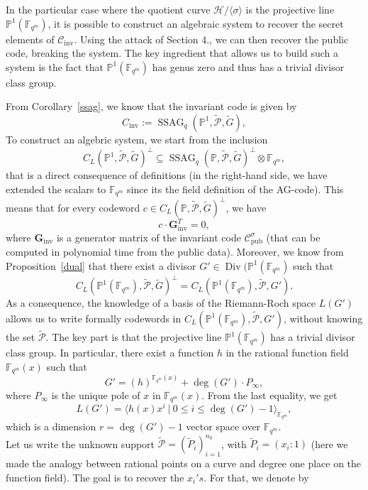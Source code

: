 \documentclass[10pt]{article}
\theoremstyle{definition}
\theoremstyle{definition}
\theoremstyle{definition}
\newcommand{\s}{\vspace{0.3cm}}
\newcommand{\cd}{\cdot}
\newcommand{\C}{\mathcal{C}}
\newcommand{\PP}{\mathbb{P}}
\newcommand{\fqm}{\mathbb{F}_{q^m}}
\newcommand{\su}{\subseteq}
\newcommand{\PR}{\mathcal{P}}
\newcommand{\Div}{\operatorname{Div}}
\newcommand{\ssag}{\operatorname{SSAG}}
\begin{document}
\s

In the particular case where the quotient curve $\mathcal{H}/\langle\sigma\rangle$ is the projective line $\PP^1(\fqm)$, it is possible to construct an algebraic system to recover the secret elements of $\C_{\mathrm{inv}}$. Using the attack of Section 4., we can then recover the public code, breaking the system. The key ingredient that allows us to build such a system is the fact that $\PP^1(\fqm)$ has genus zero and thus has a trivial divisor class group. 

\s

From Corollary~\ref{ssag}, we know that the invariant code is given by 
\[C_{\mathrm{inv}} := \ssag_q\left(\PP^1,\tilde{\PR},\tilde{G}\right),\]
To construct an algebric system, we start from the inclusion 
\[C_L(\PP^1,\tilde{\PR},\tilde{G})^{\perp} \su \ssag_q(\PP,\tilde{\PR},\tilde{G})^{\perp} \otimes \fqm,\]
that is a direct consequence of definitions (in the right-hand side, we have extended the scalars to $\fqm$ since its the field definition of the AG-code). This means that for every codeword $c \in C_L(\PP,\tilde{\PR},\tilde{G})^{\perp}$, we have 
\begin{equation}
c \cd \mathbf{G}_{\mathrm{inv}}^T = 0,
\end{equation}
where $\mathbf{G}_{\mathrm{inv}}$ is a generator matrix of the invariant code $\mathcal{C}_{\mathrm{pub}}^{\sigma}$ (that can be computed in polynomial time from the public data). Moreover, we know from Proposition~\ref{dual} that there exist a divisor $G' \in \Div(\PP^1(\fqm)$ such that
\[ C_L(\PP^1(\fqm),\tilde{\PR},\tilde{G})^{\perp} = C_L(\PP^1(\fqm),\tilde{\PR},G').\]
As a consequence, the knowledge of a basis of the Riemann-Roch space $L(G')$ allows us to write formally codewords in $C_L(\PP^1(\fqm),\tilde{\PR},G')$, without knowing the set $\tilde{\PR}$. The key part is that the projective line $\PP^1(\fqm)$ has a trivial divisor class group. In particular, there exist a function $h$ in the rational function field $\fqm(x)$ such that
\[ G' = (h)^{\fqm(x)} + \deg(G') \cd P_{\infty},\]
where $P_{\infty}$ is the unique pole of $x$ in $\fqm(x)$. From the last equality, we get
\[L(G') = \langle h(x)x^i \ | \ 0 \leq i \leq \deg(G')-1\rangle_{\fqm},\]
which is a dimension $r=\deg(G')-1$ vector space over $\fqm$. \\
Let us write the unknown support $\tilde{\PR} = (\tilde{P}_i)_{i=1}^{n_0}$, with $\tilde{P}_i=(x_i:1)$ (here we made the analogy between rational points on a curve and degree one place on the function field). The goal is to recover the $x_i's$. For that, we denote by  
\end{document}
